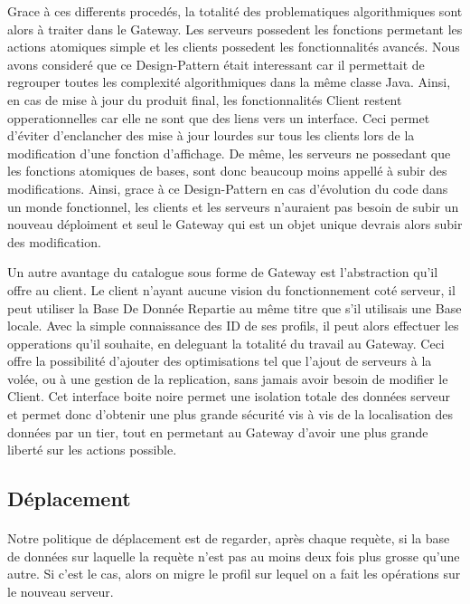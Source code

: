 Grace à ces differents procedés, la totalité des problematiques algorithmiques sont alors à traiter dans le Gateway. Les serveurs possedent les fonctions permetant les actions atomiques simple et les clients possedent les fonctionnalités avancés. Nous avons consideré que ce Design-Pattern était interessant car il permettait de regrouper toutes les complexité algorithmiques dans la même classe Java. Ainsi, en cas de mise à jour du produit final, les fonctionnalités Client restent opperationnelles car elle ne sont que des liens vers un interface. Ceci permet d'éviter d'enclancher des mise à jour lourdes sur tous les clients lors de la modification d'une fonction d'affichage.
De même, les serveurs ne possedant que les fonctions atomiques de bases, sont donc beaucoup moins appellé à subir des modifications.
Ainsi, grace à ce Design-Pattern en cas d'évolution du code dans un monde fonctionnel, les clients et les serveurs n'auraient pas besoin de subir un nouveau déploiment et seul le Gateway qui est un objet unique devrais alors subir des modification.

Un autre avantage du catalogue sous forme de Gateway est l'abstraction qu'il offre au client. Le client n'ayant aucune vision du fonctionnement coté serveur, il peut utiliser la Base De Donnée Repartie au même titre que s'il utilisais une Base locale. Avec la simple connaissance des ID de ses profils, il peut alors effectuer les opperations qu'il souhaite, en deleguant la totalité du travail au Gateway. Ceci offre la possibilité d'ajouter des optimisations tel que l'ajout de serveurs à la volée, ou à une gestion de la replication, sans jamais avoir besoin de modifier le Client.
Cet interface boite noire permet une isolation totale des données serveur et permet donc d'obtenir une plus grande sécurité vis à vis de la localisation des données par un tier, tout en permetant au Gateway d'avoir une plus grande liberté sur les actions possible. 

\subsection{Déplacement}

\paragraph{}
Notre politique de déplacement est de regarder, après chaque requète, si la base de données sur laquelle la requète n'est pas au moins deux fois plus grosse qu'une autre. Si c'est le cas, alors on migre le profil sur lequel on a fait les opérations sur le nouveau serveur.

